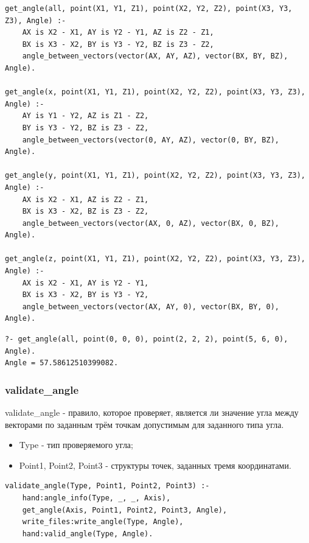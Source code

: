 \begin{lstlisting}[caption=Реализация правила get\_angle, label=rules:getangle]
get_angle(all, point(X1, Y1, Z1), point(X2, Y2, Z2), point(X3, Y3, Z3), Angle) :-
	AX is X2 - X1, AY is Y2 - Y1, AZ is Z2 - Z1,
	BX is X3 - X2, BY is Y3 - Y2, BZ is Z3 - Z2,
	angle_between_vectors(vector(AX, AY, AZ), vector(BX, BY, BZ), Angle).
	
get_angle(x, point(X1, Y1, Z1), point(X2, Y2, Z2), point(X3, Y3, Z3), Angle) :-
	AY is Y1 - Y2, AZ is Z1 - Z2,
	BY is Y3 - Y2, BZ is Z3 - Z2,
	angle_between_vectors(vector(0, AY, AZ), vector(0, BY, BZ), Angle).
	
get_angle(y, point(X1, Y1, Z1), point(X2, Y2, Z2), point(X3, Y3, Z3), Angle) :-
	AX is X2 - X1, AZ is Z2 - Z1,
	BX is X3 - X2, BZ is Z3 - Z2,
	angle_between_vectors(vector(AX, 0, AZ), vector(BX, 0, BZ), Angle).
	
get_angle(z, point(X1, Y1, Z1), point(X2, Y2, Z2), point(X3, Y3, Z3), Angle) :-
	AX is X2 - X1, AY is Y2 - Y1,
	BX is X3 - X2, BY is Y3 - Y2,
	angle_between_vectors(vector(AX, AY, 0), vector(BX, BY, 0), Angle).
\end{lstlisting}

\begin{lstlisting}[caption=Пример использования правила get\_angle, label=example:getangle]
?- get_angle(all, point(0, 0, 0), point(2, 2, 2), point(5, 6, 0), Angle).
Angle = 57.58612510399082.
\end{lstlisting}

\subsubsection{validate\_angle}
\hspace{0.6cm} validate\_angle - правило, которое проверяет, является ли значение угла между векторами по заданным трём точкам допустимым для заданного типа угла.

\begin{itemize}
	\item Type - тип проверяемого угла;
	\item Point1, Point2, Point3 - структуры точек, заданных тремя координатами.
\end{itemize}

\begin{lstlisting}[caption=Реализация правила validate\_angle, label=rules:validateangle]
validate_angle(Type, Point1, Point2, Point3) :-
	hand:angle_info(Type, _, _, Axis),
	get_angle(Axis, Point1, Point2, Point3, Angle),
	write_files:write_angle(Type, Angle),
	hand:valid_angle(Type, Angle).
\end{lstlisting}

